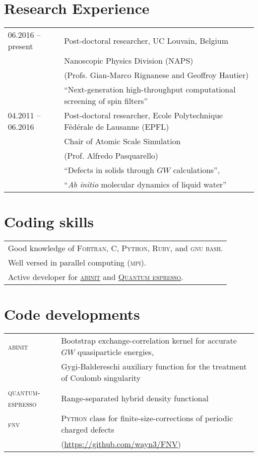 \documentclass[a4paper, 11pt, DIV=15,headings=normal]{scrartcl}
\begin{document}
\section*{Research Experience}
\begin{tabular}{ll}
06.2016 -- present & Post-doctoral researcher, UC Louvain, Belgium \\
                   & Nanoscopic Physics Division (NAPS) \\ 
                   & (Profs. Gian-Marco Rignanese and Geoffroy Hautier)  \\
                   & ``Next-generation high-throughput computational
                     screening of spin filters'' \\
04.2011 -- 06.2016 & Post-doctoral researcher, Ecole Polytechnique F\'{e}d\'{e}rale de Lausanne (EPFL) \\
                   & Chair of Atomic Scale Simulation  \\
                   & (Prof. Alfredo Pasquarello) \\
                   & ``Defects in solids through $GW$ calculations'', \\
                   & ``\textit{Ab initio} molecular dynamics of liquid water''
\end{tabular}

\section*{Coding skills}
\begin{tabular}{l}
Good knowledge of \textsc{Fortran}, \textsc{C}, \textsc{Python}, \textsc{Ruby}, and
\textsc{gnu bash}.\\
Well versed in parallel computing (\textsc{mpi}). \\
Active developer for \href{http://www.abinit.org}{\textsc{abinit}} and 
\href{http://www.quantum-espresso.org}{\textsc{Quantum espresso}}. \\
\end{tabular}


\section*{Code developments}
\begin{tabular}{ll}
\textsc{abinit}  & Bootstrap exchange-correlation kernel for accurate $GW$ quasiparticle energies, \\
                 & Gygi-Baldereschi auxiliary function for the treatment of
Coulomb singularity \\
\textsc{quantum-espresso} & Range-separated hybrid density functional \\
\textsc{fnv}     & \textsc{Python} class for finite-size-corrections of
periodic charged defects \\
                 & (\url{https://github.com/wayn3/FNV})
\\
\end{tabular} 
\end{document}
